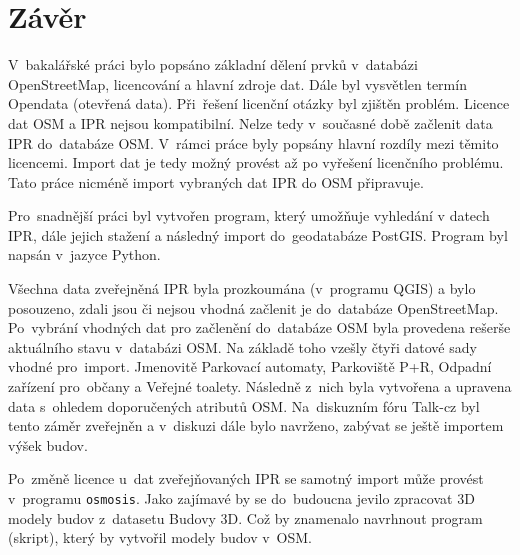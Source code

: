\chapter{Závěr}
\label{5-zaver}

V~bakalářské práci bylo popsáno základní dělení prvků v~databázi
OpenStreetMap, licencování a hlavní zdroje dat. Dále byl vysvětlen termín
Opendata (otevřená data).
Při~řešení licenční otázky byl zjištěn problém. Licence dat
OSM a IPR nejsou kompatibilní. Nelze tedy v~současné době začlenit
data IPR do~databáze OSM. V~rámci práce byly popsány hlavní rozdíly mezi těmito licencemi.
Import dat je tedy možný provést až po vyřešení licenčního
problému. Tato práce nicméně import vybraných dat IPR do OSM připravuje.

Pro~snadnější práci byl vytvořen program, který umožňuje vyhledání
v datech IPR, dále jejich stažení a
následný import do~geodatabáze PostGIS. Program byl napsán v~jazyce
Python.


Všechna data zveřejněná IPR byla prozkoumána (v~programu QGIS)
a bylo posouzeno, zdali jsou či nejsou vhodná začlenit je do~databáze
OpenStreetMap. Po~vybrání vhodných dat pro začlenění do~databáze OSM byla
provedena rešerše aktuálního stavu v~databázi OSM.
Na základě toho vzešly čtyři datové sady vhodné pro~import.
Jmenovitě Parkovací automaty, Parkoviště P+R, Odpadní zařízení
pro~občany a Veřejné toalety. Následně z~nich byla vytvořena a upravena
data s~ohledem doporučených atributů OSM.
Na~diskuzním fóru Talk-cz byl tento záměr zveřejněn a v~diskuzi dále bylo
navrženo, zabývat se ještě importem výšek budov.


Po~změně licence u~dat zveřejňovaných IPR se samotný import může provést
v~programu {\tt osmosis}.
Jako zajímavé by se do~budoucna jevilo zpracovat 3D modely budov
z~datasetu Budovy 3D. Což by znamenalo navrhnout program (skript), který by vytvořil
modely budov v~OSM.
